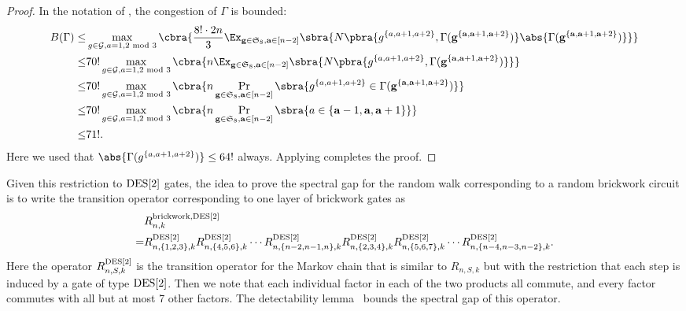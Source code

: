 \begin{proof}
    In the notation of , the congestion of $\Gamma$ is bounded:
    \begin{align*}
        B(\Gamma)\leq &\max_{g\in \mathcal{G},a=1,2\text{ mod 3}}\cbra{\frac{8!\cdot2n}{3}\Ex_{\mathbf{g}\in \mathfrak{S}_{8},\mathbf{a}\in[n-2]}\sbra{N\pbra{g^{\{a,a+1,a+2\}},\Gamma(\mathbf{g}^{\{\mathbf a,\mathbf a+1,\mathbf a+2\}})}\abs{\Gamma(\mathbf{g}^{\{\mathbf a,\mathbf a+1,\mathbf a+2\}})}}}\\
        \leq & 70!\max_{g\in \mathcal{G},a=1,2\text{ mod 3}}\cbra{n\Ex_{\mathbf{g}\in \mathfrak{S}_{8},\mathbf{a}\in[n-2]}\sbra{N\pbra{g^{\{a,a+1,a+2\}},\Gamma(\mathbf{g}^{\{\mathbf a,\mathbf a+1,\mathbf a+2\}})}}}\\
        \leq &70!\max_{g\in \mathcal{G},a=1,2\text{ mod 3}}\cbra{n\Pr_{\mathbf{g}\in \mathfrak{S}_{8},\mathbf{a}\in[n-2]}\sbra{g^{\{a,a+1,a+2\}}\in \Gamma(\mathbf{g}^{\{\mathbf a,\mathbf a+1,\mathbf a+2\}})}}\\
        \leq &70!\max_{g\in \mathcal{G},a=1,2\text{ mod 3}}\cbra{n\Pr_{\mathbf{g}\in \mathfrak{S}_{8},\mathbf{a}\in[n-2]}\sbra{a\in\{\mathbf{a}-1,\mathbf{a},\mathbf{a}+1\}}}\\
        \leq & 71!.
    \end{align*}
    Here we used that $\abs{\Gamma(g^{\{a,a+1,a+2\}})}\leq 64!$ always. Applying  completes the proof.
\end{proof}


Given this restriction to $\mathrm{DES}[2]$ gates, the idea to prove the spectral gap for the random walk corresponding to a random brickwork circuit is to write the transition operator corresponding to one layer of brickwork gates as
\begin{align*}
    &R_{n,k}^{\text{brickwork},\mathrm{DES}[2]}\\
    =&R_{n,\{1,2,3\},k}^{\mathrm{DES}[2]}R_{n,\{4,5,6\},k}^{\mathrm{DES}[2]}\cdots R_{n,\{n-2,n-1,n\},k}^{\mathrm{DES}[2]}R_{n,\{2,3,4\},k}^{\mathrm{DES}[2]}R_{n,\{5,6,7\},k}^{\mathrm{DES}[2]}\cdots R_{n,\{n-4,n-3,n-2\},k}^{\mathrm{DES}[2]}.
\end{align*}
Here the operator $R_{n,S,k}^{\mathrm{DES}[2]}$ is the transition operator for the Markov chain that is similar to $R_{n,S,k}$ but with the restriction that each step is induced by a gate of type $\mathrm{DES}[2]$. Then we note that each individual factor in each of the two products all commute, and every factor commutes with all but at most 7 other factors. The detectability lemma~\cite{aharonov2009detectability} bounds the spectral gap of this operator.


